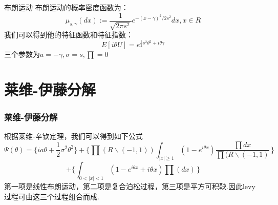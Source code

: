 \documentclass[10pt,aspectratio=169,mathserif]{beamer}
\begin{document}
\begin{frame}
布朗运动\newline\newline
布朗运动的概率密度函数为：\[\mu_{s,\gamma}(dx):=\frac{1}{\sqrt{2\pi s^{2}}}e^{-(x-\gamma)^{2}/2s^{2}}dx ,x \in R\]我们可以得到他的特征函数和特征指数：\[E[i\theta U]=e^{\frac{1}{2}s^{2}\theta^{2}+i\theta\gamma}\]三个参数为$a=-\gamma,\sigma=s,\prod=0$

\end{frame}

\section{莱维-伊藤分解}
\begin{frame}
 \frametitle{莱维-伊藤分解}


根据莱维-辛钦定理，我们可以得到如下公式\[\Psi(\theta)=\{ia\theta+\frac{1}{2}\sigma^{2}\theta^{2}\}+\{\prod(R\backslash(-1,1))\int_{|x|\geq1}(1-e^{i\theta x})\frac{\prod{dx}}{\prod(R\backslash(-1,1)} \,\}\]\newline\[+\{\int_{0<|x|<1}(1-e^{i\theta x}+i\theta x)\prod(dx) \,\} \]
第一项是线性布朗运动，第二项是复合泊松过程，第三项是平方可积鞅.因此levy过程可由这三个过程组合而成.

\end{frame}
\end{document}
